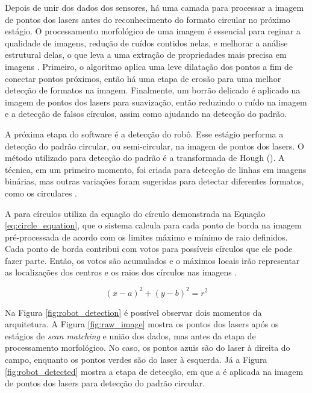 \documentclass[acronym, symbols, table]{fei}
\begin{document}
				Depois de unir dos dados dos sensores, há uma camada para processar a imagem de pontos dos lasers antes do reconhecimento do formato circular no próximo estágio. O processamento morfológico de uma imagem é essencial para reginar a qualidade de imagens, redução de ruídos contidos nelas, e melhorar a análise estrutural delas, o que leva a uma extração de propriedades mais precisa em imagens \cite{lotufo2023morphological}. Primeiro, o algoritmo aplica uma leve dilatação dos pontos a fim de conectar pontos próximos, então há uma etapa de erosão para uma melhor detecção de formatos na imagem. Finalmente, um borrão delicado é aplicado na imagem de pontos dos lasers para suavização, então reduzindo o ruído na imagem e a detecção de falsos círculos, assim como ajudando na detecção do padrão.
			
				A próxima etapa do software é a detecção do robô. Esse estágio performa a detecção do padrão circular, ou semi-circular, na imagem de pontos dos lasers. O método utilizado para detecção do padrão é a transformada de Hough (). A técnica, em um primeiro momento, foi criada para detecção de linhas em imagens binárias, mas outras variações foram sugeridas para detectar diferentes formatos, como os circulares \cite{mukhopadhyay2015survey}.
				
				A  para círculos utiliza da equação do círculo demonstrada na Equação \eqref{eq:circle_equation}, que o sistema calcula para cada ponto de borda na imagem pré-processada de acordo com os limites máximo e mínimo de raio definidos. Cada ponto de borda contribui com votos para possíveis círculos que ele pode fazer parte. Então, os votos são acumulados e o máximos locais irão representar as localizações dos centros e os raios dos círculos nas imagens \cite{hassanein2015survey}.
				
				\begin{equation}
					\label{eq:circle_equation}
					(x-a)^2 + (y-b)^2 = r^2
				\end{equation}
			
				Na Figura \ref{fig:robot_detection} é possível observar dois momentos da arquitetura. A Figura \ref{fig:raw_image} mostra os pontos dos lasers após os estágios de \textit{scan matching} e união dos dados, mas antes da etapa de processamento morfológico. No caso, os pontos azuis são do laser à direita do campo, enquanto os pontos verdes são do laser à esquerda. Já a Figura \ref{fig:robot_detected} mostra a etapa de detecção, em que a  é aplicada na imagem de pontos dos lasers para detecção do padrão circular.
				
\end{document}

